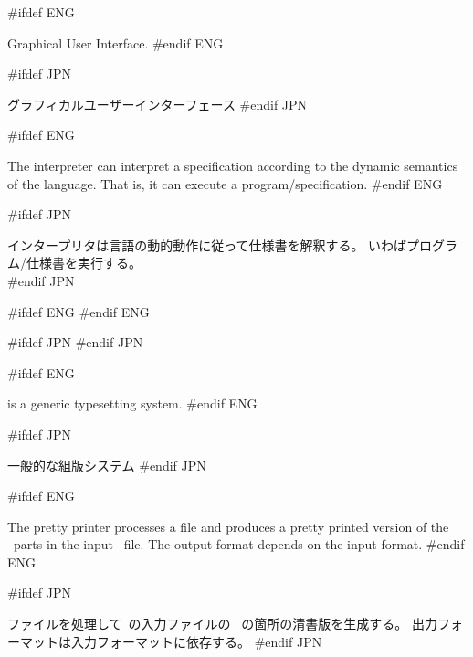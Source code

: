 \begin{description}
#ifdef ENG
\item[GUI:] Graphical User Interface.
#endif ENG

#ifdef JPN
\item[GUI:] グラフィカルユーザーインターフェース
#endif JPN


#ifdef ENG
\item[Interpreter:] The interpreter can interpret a specification
  according to the dynamic semantics of the language. That is, it can
  execute a program/specification. 
#endif ENG

#ifdef JPN
\item[インタープリタ:] インタープリタは言語の動的動作に従って仕様書を解釈する。
  いわばプログラム/仕様書を実行する。\\
#endif JPN

#ifdef ENG
#endif ENG
 
#ifdef JPN
#endif JPN
 
#ifdef ENG
\item[\LaTeX:] is a generic typesetting system.
#endif ENG

#ifdef JPN
\item[\LaTeX:] 一般的な組版システム
#endif JPN

#ifdef ENG
\item[Pretty Printer:] The pretty printer processes a file
  and produces a pretty printed version of the \vdmslpp\ parts in the
  input \vdmslpp\ file. The output format depends on the input format.
#endif ENG

#ifdef JPN
\item[清書機能:] ファイルを処理して\vdmslpp\ の入力ファイルの
  \vdmslpp\ の箇所の清書版を生成する。
  出力フォーマットは入力フォーマットに依存する。
#endif JPN


\end{description}
